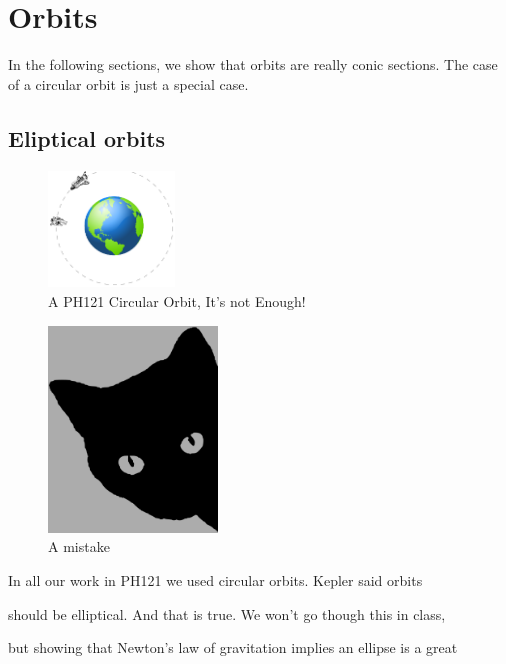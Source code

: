 \chapter{Orbits}
In the following sections, we show that orbits are really conic sections. The case of a circular orbit is just a special case.
\section{Eliptical orbits}


\begin{figure}[h]
	\begin{center}
	\includegraphics[width=0.3\textwidth]{orbit_figure}	
	\caption{A PH121 Circular Orbit, It's not Enough!}
\end{center}
\end{figure}


\begin{figure}[h!]
	\begin{center}
		\includegraphics[width=0.4\textwidth]{cat}	
		\caption{A mistake}
	\end{center}
\end{figure}

In all our work in PH121 we used circular orbits. Kepler said orbits

should be elliptical. And that is true. We won't go though this in class,

but showing that Newton's law of gravitation implies an ellipse is a great


